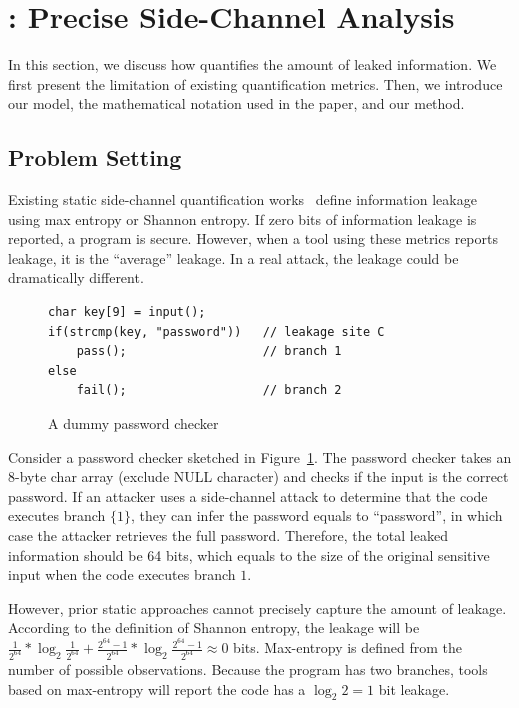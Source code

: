 \section{\tool{}: Precise Side-Channel Analysis}
\label{sec:trace-qif}
In this section, we discuss how \tool{} quantifies the amount of leaked
information. We first present the limitation of existing quantification metrics.
Then, we introduce our model, the mathematical notation used in the
paper, and our method.

\subsection{Problem Setting}
Existing static side-channel quantification
works~\cite{182946,Wichelmann:2018:MFF:3274694.3274741,zhang2010sidebuster,bang2016string} define information
leakage using max entropy or Shannon entropy.  If zero bits of
information leakage is reported, a program is secure. However, when a tool using these metrics reports leakage, it is the ``average'' leakage. In a real attack, the leakage could be dramatically different.

 \begin{figure}[h!]
    \vspace*{-5pt}
    \centering
    \begin{lstlisting}[xleftmargin=.03\textwidth,xrightmargin=.01\textwidth]
char key[9] = input();
if(strcmp(key, "password"))   // leakage site C
    pass();                   // branch 1
else
    fail();                   // branch 2
\end{lstlisting}
\vspace*{-10pt}
    \caption{A dummy password checker}
    \label{fig:password-checker}
\vspace*{-5pt}
\end{figure}

Consider a password checker sketched in Figure~\ref{fig:password-checker}.
The password checker takes an 8-byte char array (exclude \textsf{NULL} character) 
and checks if the input is the correct password. If an attacker uses a side-channel attack to determine that the code executes branch
$\{{1\}}$, they can infer the password equals to
``password'', in which case the attacker retrieves the full password.
Therefore, the total leaked information should be 64 bits, which equals to the
size of the original sensitive input when the code executes branch
$1$.

However, prior static approaches cannot precisely capture the amount of leakage. According to the definition of Shannon entropy, the leakage will be
$\frac{1}{2^{64}}*\log_{2}\frac{1}{2^{64}} + \frac{2^{64}-1}{2^{64}}
*\log_{2}\frac{2^{64}-1}{2^{64}} \approx 0$ bits. Max-entropy is defined from the
number of possible observations. Because the program has two
branches, tools based on max-entropy will report the code has a $\log_2{2} = 1$
bit leakage.

